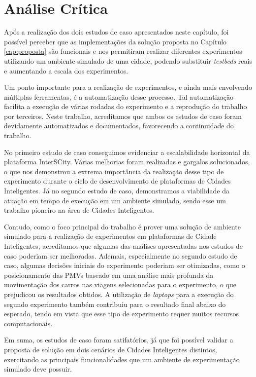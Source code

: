 \section{Análise Crítica}


Após a realização dos dois estudos de caso apresentados neste capítulo, foi possível perceber que as implementações da solução proposta no Capítulo \ref{cap:proposta} são funcionais e nos permitiram realizar
diferentes experimentos utilizando um ambiente simulado de uma cidade, podendo substituir \textit{testbeds} reais e aumentando a escala dos experimentos.

Um ponto importante para a realização de experimentos, e ainda mais envolvendo múltiplas ferramentas, é a automatização desse processo.
Tal automatização facilita a execução de várias rodadas do experimento e a reprodução do trabalho por terceiros.
Neste trabalho, acreditamos que ambos os estudos de caso foram devidamente automatizados e documentados, favorecendo a continuidade do trabalho.

No primeiro estudo de caso conseguimos evidenciar a escalabilidade horizontal da plataforma InterSCity.
Várias melhorias foram realizadas e gargalos solucionados, o que nos demonstrou a extrema importância da realização desse tipo de experimento durante o ciclo de desenvolvimento de plataformas de Cidades
Inteligentes.
Já no segundo estudo de caso, demonstramos a viabilidade da atuação em tempo de execução em um ambiente simulado, sendo esse um trabalho pioneiro na área de Cidades Inteligentes.
 
Contudo, como o foco principal do trabalho é prover uma solução de ambiente simulado para a realização de experimentos em plataformas de Cidade Inteligentes, acreditamos que algumas das análises
apresentadas nos estudos de caso poderiam ser melhoradas.
Ademais, especialmente no segundo estudo de caso, algumas decisões iniciais do experimento poderiam ser otimizadas, como o posicionamento das PMVs baseado em uma análise mais profunda da movimentação
dos carros nas viagens selecionadas para o experimento, o que prejudicou os resultados obtidos.
A utilização de \textit{laptops} para a execução do segundo experimento também contribuiu para o resultado final abaixo do esperado, tendo em vista que esse tipo de experimento requer muitos recursos
computacionais.

Em suma, os estudos de caso foram satifatórios, já que foi possível validar a proposta de solução em dois cenários de Cidades Inteligentes distintos, exercitando as principais funcionalidades que
um ambiente de experimentação simulado deve possuir.


